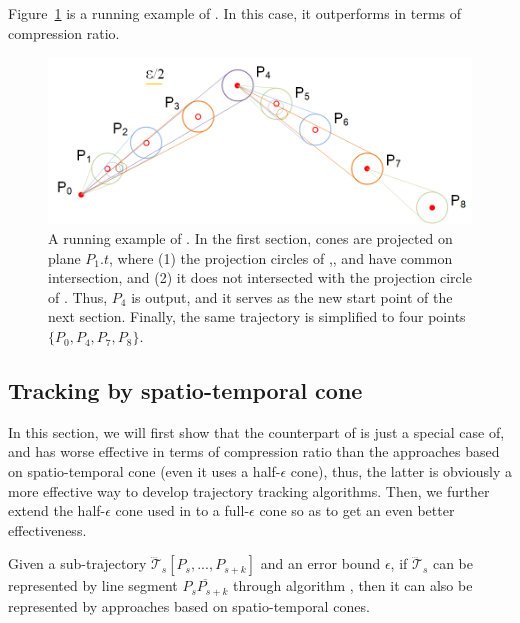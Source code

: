 Figure~\ref{fig:cised} is a running example of \cised. In this case, it outperforms \ldrh in terms of compression ratio.

%


\begin{figure}[tb!]
	\centering
	\includegraphics[scale=0.9]{figures/Fig-CISED-SH.png}
	\vspace{-1ex}
	\caption{\small A running example of \cised. In the first section, cones are projected on plane $P_1.t$, where (1) the projection circles of ,, and  have common intersection, and (2) it does not intersected with the projection circle of . Thus, $P_4$ is output, and it serves as the new start point of the next section. Finally, the same trajectory is simplified to four points $\{P_0, P_4, P_7, P_8\}$.}
	\vspace{-2ex}
	\label{fig:cised}
\end{figure}




\subsection{Tracking by spatio-temporal cone}

In this section, we will first show that the counterpart of \ldrh is just a special case of, and has worse effective in terms of compression ratio than the approaches based on spatio-temporal cone (even it uses a half-$\epsilon$ cone), thus, the latter is obviously a more effective way to develop trajectory tracking algorithms. Then, we further extend the half-$\epsilon$ cone used in \cised to a full-$\epsilon$ cone so as to get an even better effectiveness.



\begin{theorem}
\label{theo-ldrh-cised}
Given a sub-trajectory $\dddot{\mathcal{T}}_s[P_s,...,P_{s+k}]$ and an error bound $\epsilon$, if $\dddot{\mathcal{T}}_s$ can be represented by line segment $\overline{P_sP_{s+k}}$ through algorithm \ldrh, then it can also be represented by approaches based on spatio-temporal cones.
\end{theorem}

